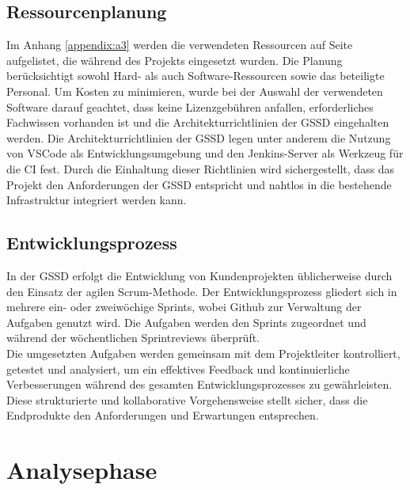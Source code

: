 \begin{flushleft}
	\subsection{Ressourcenplanung}
	Im Anhang \ref{appendix:a3} werden die verwendeten Ressourcen auf Seite \pageref{appendix:a3}
	aufgelistet, die während des Projekts eingesetzt wurden. Die Planung berücksichtigt
	sowohl Hard- als auch Software-Ressourcen sowie das beteiligte Personal.
	Um Kosten zu minimieren, wurde bei der Auswahl der verwendeten Software darauf geachtet,
	dass keine Lizenzgebühren anfallen, erforderliches Fachwissen vorhanden ist und die
	Architekturrichtlinien der \acs{GSSD} eingehalten werden.
	Die Architekturrichtlinien der \acs{GSSD} legen unter anderem die Nutzung von
	\acs{VSCode} als Entwicklungsumgebung und den Jenkins-Server als Werkzeug für die \acs{CI} fest. Durch die Einhaltung dieser Richtlinien wird sichergestellt,
	dass das Projekt den Anforderungen der \acs{GSSD} entspricht und nahtlos in die bestehende
	Infrastruktur integriert werden kann.

	\subsection{Entwicklungsprozess}
	In der \acs{GSSD} erfolgt die Entwicklung von Kundenprojekten üblicherweise durch den Einsatz der agilen Scrum-Methode. Der Entwicklungsprozess gliedert sich in mehrere ein- oder zweiwöchige Sprints, wobei Github zur Verwaltung der Aufgaben genutzt wird. Die Aufgaben werden den Sprints zugeordnet und während der wöchentlichen Sprintreviews überprüft.\\
Die umgesetzten Aufgaben werden gemeinsam mit dem Projektleiter kontrolliert, getestet und analysiert, um ein effektives Feedback und kontinuierliche Verbesserungen während des gesamten Entwicklungsprozesses zu gewährleisten. Diese strukturierte und kollaborative Vorgehensweise stellt sicher, dass die Endprodukte den Anforderungen und Erwartungen entsprechen.\\

	\section{Analysephase}

\end{flushleft}
